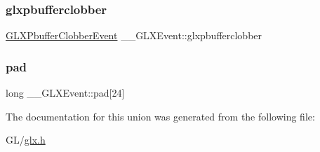 \subsubsection{\texorpdfstring{glxpbufferclobber}{glxpbufferclobber}}
{\footnotesize\ttfamily \hyperlink{struct_g_l_x_pbuffer_clobber_event}{G\+L\+X\+Pbuffer\+Clobber\+Event} \+\_\+\+\_\+\+G\+L\+X\+Event\+::glxpbufferclobber}

\mbox{\label{union_____g_l_x_event_a1cb8f6e7e77a34d25baf43b3f3bc2d4f}} 
\subsubsection{\texorpdfstring{pad}{pad}}
{\footnotesize\ttfamily long \+\_\+\+\_\+\+G\+L\+X\+Event\+::pad\mbox{[}24\mbox{]}}



The documentation for this union was generated from the following file\+:\begin{DoxyCompactItemize}
\item 
G\+L/\hyperlink{glx_8h}{glx.\+h}\end{DoxyCompactItemize}
